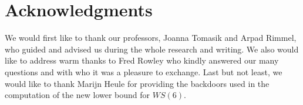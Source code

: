 \documentclass[3p]{elsarticle}
\newtheorem{computational theorem}[definition]{Computational Theorem}
\newcommand{\WS}{\mathit{WS}}
\begin{document}
\section{Acknowledgments}

\qquad We would first like to thank our professors, Joanna Tomasik and Arpad Rimmel, who guided and advised
us during the whole research and writing. We also would like to address warm thanks
to Fred Rowley who kindly answered our many questions and with who it was a pleasure to exchange. 
Last but not least, we would like to thank Marijn Heule for providing the backdoors used in the computation of the 
new lower bound for \(\WS(6)\).






\end{document}
